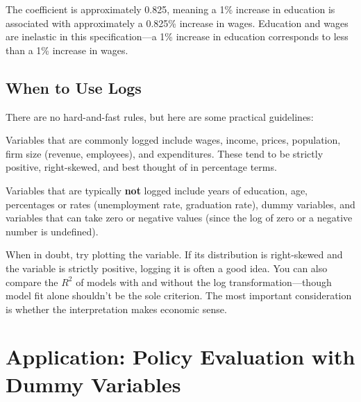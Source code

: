\documentclass[
  letterpaper,
  DIV=11,
  numbers=noendperiod]{scrreprt}
\begin{document}
The coefficient is approximately 0.825, meaning a 1\% increase in
education is associated with approximately a 0.825\% increase in wages.
Education and wages are inelastic in this specification---a 1\% increase
in education corresponds to less than a 1\% increase in wages.

\subsection{When to Use Logs}\label{when-to-use-logs}

There are no hard-and-fast rules, but here are some practical
guidelines:

Variables that are commonly logged include wages, income, prices,
population, firm size (revenue, employees), and expenditures. These tend
to be strictly positive, right-skewed, and best thought of in percentage
terms.

Variables that are typically \textbf{not} logged include years of
education, age, percentages or rates (unemployment rate, graduation
rate), dummy variables, and variables that can take zero or negative
values (since the log of zero or a negative number is undefined).

\begin{tcolorbox}[enhanced jigsaw, arc=.35mm, bottomrule=.15mm, bottomtitle=1mm, breakable, colback=white, colbacktitle=quarto-callout-tip-color!10!white, colframe=quarto-callout-tip-color-frame, coltitle=black, left=2mm, leftrule=.75mm, opacityback=0, opacitybacktitle=0.6, rightrule=.15mm, title=\textcolor{quarto-callout-tip-color}{\faLightbulb}\hspace{0.5em}{Practical Advice}, titlerule=0mm, toprule=.15mm, toptitle=1mm]

When in doubt, try plotting the variable. If its distribution is
right-skewed and the variable is strictly positive, logging it is often
a good idea. You can also compare the \(R^2\) of models with and without
the log transformation---though model fit alone shouldn't be the sole
criterion. The most important consideration is whether the
interpretation makes economic sense.

\end{tcolorbox}

\section{Application: Policy Evaluation with Dummy
Variables}\label{application-policy-evaluation-with-dummy-variables}
\end{document}

